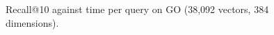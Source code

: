 \begin{figure}[t]
\centering

\caption{Recall@10 against time per query on GO (38,092 vectors, 384 dimensions).}
\label{fig-knn}
\end{figure}
